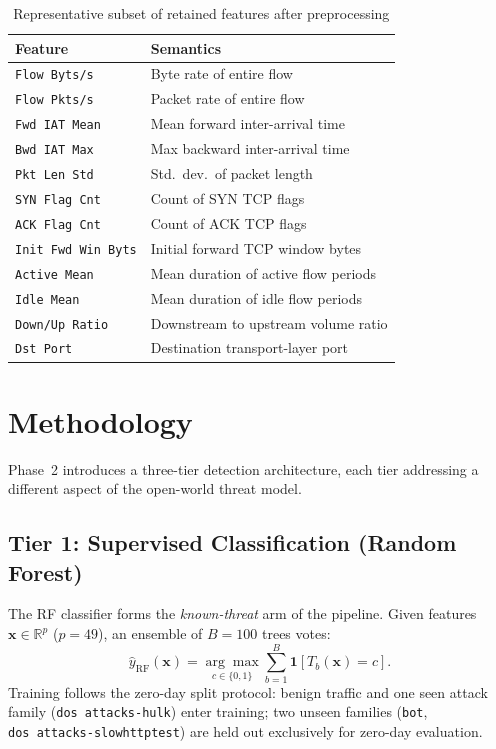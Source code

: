 \documentclass[10pt,conference]{IEEEtran}
\begin{document}
\begin{table}[H]
\centering
\caption{Representative subset of retained features after preprocessing}
\label{tab:features}
\begin{tabular}{ll}
\toprule
\textbf{Feature} & \textbf{Semantics} \\
\midrule
\texttt{Flow Byts/s}   & Byte rate of entire flow \\
\texttt{Flow Pkts/s}   & Packet rate of entire flow \\
\texttt{Fwd IAT Mean}  & Mean forward inter-arrival time \\
\texttt{Bwd IAT Max}   & Max backward inter-arrival time \\
\texttt{Pkt Len Std}   & Std.\ dev.\ of packet length \\
\texttt{SYN Flag Cnt}  & Count of SYN TCP flags \\
\texttt{ACK Flag Cnt}  & Count of ACK TCP flags \\
\texttt{Init Fwd Win Byts} & Initial forward TCP window bytes \\
\texttt{Active Mean}   & Mean duration of active flow periods \\
\texttt{Idle Mean}     & Mean duration of idle flow periods \\
\texttt{Down/Up Ratio} & Downstream to upstream volume ratio \\
\texttt{Dst Port}      & Destination transport-layer port \\
\bottomrule
\end{tabular}
\end{table}

\section{Methodology}
\label{sec:methodology}

Phase~2 introduces a three-tier detection architecture, each tier
addressing a different aspect of the open-world threat model.

\subsection{Tier 1: Supervised Classification (Random Forest)}

The RF classifier forms the \emph{known-threat} arm of the pipeline.
Given features $\mathbf{x} \in \mathbb{R}^{p}$ ($p=49$), an ensemble
of $B=100$ trees votes:
\begin{equation}
  \hat{y}_{\text{RF}}(\mathbf{x})
  = \underset{c \in \{0,1\}}{\arg\max}
    \sum_{b=1}^{B} \mathbf{1}\!\left[T_b(\mathbf{x}) = c\right].
  \label{eq:rf}
\end{equation}
Training follows the zero-day split protocol: benign traffic and one
seen attack family (\texttt{dos~attacks-hulk}) enter training; two
unseen families (\texttt{bot}, \texttt{dos~attacks-slowhttptest}) are
held out exclusively for zero-day evaluation.
\end{document}

